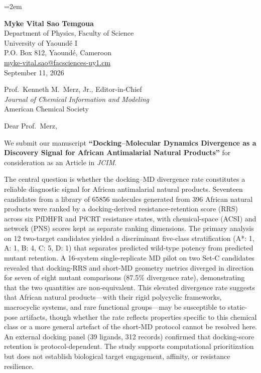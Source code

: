 \documentclass[11pt,letterpaper]{article}
\begin{document}
\emergencystretch=2em

\begin{flushleft}
\textbf{Myke Vital Sao Temgoua} \\
Department of Physics, Faculty of Science \\
University of Yaound\'{e} I \\
P.O. Box 812, Yaound\'{e}, Cameroon \\
\href{mailto:myke-vital.sao@facsciences-uy1.cm}{myke-vital.sao@facsciences-uy1.cm} \\[1.5em]
September 11, 2026
\end{flushleft}

\begin{flushleft}
Prof.\ Kenneth M.\ Merz, Jr., Editor-in-Chief \\
\textit{Journal of Chemical Information and Modeling} \\
American Chemical Society
\end{flushleft}

\vspace{0.5em}

\noindent Dear Prof.\ Merz,

We submit our manuscript \textbf{``Docking--Molecular Dynamics Divergence as a Discovery Signal for African Antimalarial Natural Products''} for consideration as an Article in \textit{JCIM}.

The central question is whether the docking--MD divergence rate constitutes a reliable diagnostic signal for African antimalarial natural products. Seventeen candidates from a library of \num{65856} molecules generated from 396 African natural products were ranked by a docking-derived resistance-retention score (RRS) across six PfDHFR and PfCRT resistance states, with chemical-space (ACSI) and network (PNS) scores kept as separate ranking dimensions. The primary analysis on 12 two-target candidates yielded a discriminant five-class stratification (A*: 1, A: 1, B: 4, C: 5, D: 1) that separates predicted wild-type potency from predicted mutant retention. A 16-system single-replicate MD pilot on two Set-C candidates revealed that docking-RRS and short-MD geometry metrics diverged in direction for seven of eight mutant comparisons (87.5\% divergence rate), demonstrating that the two quantities are non-equivalent. This elevated divergence rate suggests that African natural products---with their rigid polycyclic frameworks, macrocyclic systems, and rare functional groups---may be susceptible to static-pose artifacts, though whether the rate reflects properties specific to this chemical class or a more general artefact of the short-MD protocol cannot be resolved here. An external docking panel (39 ligands, 312 records) confirmed that docking-score retention is protocol-dependent. The study supports computational prioritization but does not establish biological target engagement, affinity, or resistance resilience.
\end{document}
